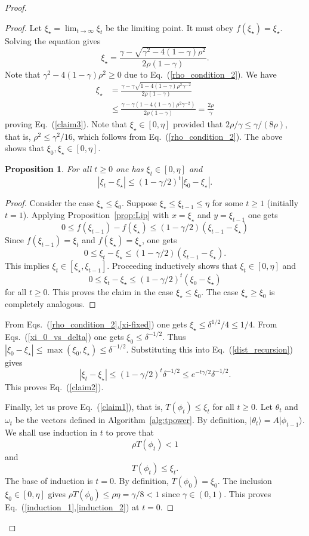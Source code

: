 \documentclass[
  reprint,            %
  amsmath,amssymb,
  aps,
  superscriptaddress, %
  longbibliography
]{revtex4-2}
\newtheorem{prop}[theorem]{Proposition}
\theoremstyle{definition}
\newcommand{\ra}{\rangle}
\newcommand{\be}{\begin{equation}}
\newcommand{\ee}{\end{equation}}
\begin{document}
\begin{proof}
\begin{proof}
Let $\xi_\star=\lim_{t\to \infty} \xi_t$ be the limiting point.
It must obey  $f(\xi_\star)=\xi_\star$.  Solving the equation gives
\[
\xi_\star=\frac{\gamma-\sqrt{\gamma^2-4(1-\gamma)\rho^2}}{2\rho(1-\gamma)}.
\]
Note that $\gamma^2-4(1-\gamma)\rho^2\ge 0$ due to Eq.~(\ref{rho_condition_2}).
We have
\begin{align}
\label{xi-fixed}
\xi_\star & =\frac{\gamma-\gamma \sqrt{1-4(1-\gamma)\rho^2\gamma^{-2}}}{2\rho(1-\gamma)} \nonumber \\
& 
\le \frac{\gamma - \gamma (1-4(1-\gamma)\rho^2\gamma^{-2})}{2\rho(1-\gamma)}=\frac{2\rho}{\gamma}
\end{align}
proving Eq.~(\ref{claim3}).
Note that $\xi_\star \in [0,\eta]$ provided that $2\rho/\gamma \le \gamma/(8\rho)$, that is, 
$\rho^2 \le \gamma^2/16$, which follows from Eq.~(\ref{rho_condition_2}).
The above shows that $\xi_0,\xi_\star \in [0,\eta]$.
\begin{prop}
\label{prop:monotone}
For all $t\ge 0$ one has $\xi_t \in [0,\eta]$ and 
\be
\label{dist_recursion}
|\xi_{t}-\xi_\star| \le (1-\gamma/2)^t |\xi_0 - \xi_\star|.
\ee
\end{prop}
\begin{proof}
Consider the case $\xi_\star \le \xi_0$.
Suppose $\xi_\star\le \xi_{t-1} \le \eta$ for some $t\ge 1$ (initially $t=1$).
Applying Proposition~\ref{prop:Lip} with $x=\xi_\star$ and $y=\xi_{t-1}$ one gets
\[
0\le f(\xi_{t-1}) - f(\xi_\star) \le (1-\gamma/2)(\xi_{t-1}-\xi_\star)
\]
Since $f(\xi_{t-1})=\xi_t$ and $f(\xi_\star)=\xi_\star$, one gets
\[
0\le \xi_t - \xi_\star \le  (1-\gamma/2)(\xi_{t-1}-\xi_\star).
\]
This implies $\xi_t \in [\xi_\star,\xi_{t-1}]$.
Proceeding inductively shows that   $\xi_t \in [0,\eta]$
and
\[
0\le \xi_t - \xi_\star \le (1-\gamma/2)^t (\xi_0-\xi_\star)
\]
for all $t\ge 0$. 
This proves  the claim 
 in the case $\xi_\star\le \xi_0$.
The  case $\xi_\star \ge \xi_0$ is completely analogous.
\end{proof}
From Eqs.~(\ref{rho_condition_2},\ref{xi-fixed}) one gets $\xi_\star \le \delta^{1/2}/4 \le 1/4$. 
From  Eqs.~(\ref{xi_0_vs_delta}) one gets $\xi_0\le \delta^{-1/2}$. Thus
$|\xi_0-\xi_\star|\le \max{(\xi_0,\xi_\star)}\le \delta^{-1/2}$. Substituting this into Eq.~(\ref{dist_recursion}) gives
\[
|\xi_{t}-\xi_\star|  \le (1-\gamma/2)^t \delta^{-1/2} \le e^{-t \gamma/2} \delta^{-1/2}.
\]
This proves Eq.~(\ref{claim2}).



Finally, let us prove Eq.~(\ref{claim1}), that is, $T(\phi_t)\le \xi_t$ for all $t\ge 0$.
Let $\theta_t$ and $\omega_t$ be the vectors defined  in Algorithm~\ref{alg:tpower}.
By definition, $|\theta_t\ra=A|\phi_{t-1}\ra$.
We shall use induction in $t$ to prove that 
\be
\label{induction_1}
\rho T(\phi_t)<1
\ee
and
\be
\label{induction_2}
T(\phi_t) \le \xi_t.
\ee
The base of induction is $t=0$. 
By definition,  $T(\phi_0)=\xi_0$.
The inclusion $\xi_0\in [0,\eta]$ gives
$\rho T(\phi_0) \le \rho \eta =\gamma/8<1$ since $\gamma \in (0,1)$.
This proves Eq.~(\ref{induction_1},\ref{induction_2}) at $t=0$.


\end{proof}
\end{proof}
\end{document}

